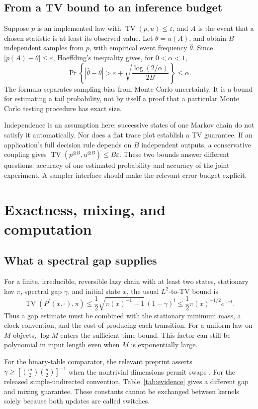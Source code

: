 \documentclass[11pt]{article}
\newcommand{\TV}{\operatorname{TV}}
\begin{document}
\subsection{From a TV bound to an inference budget}
Suppose \(p\) is an implemented law with \(\TV(p,u)\leq\varepsilon\), and \(A\) is the event that a chosen statistic is at least its observed value. Let \(\theta=u(A)\), and obtain \(B\) independent samples from \(p\), with empirical event frequency \(\widehat\theta\). Since \(|p(A)-\theta|\leq\varepsilon\), Hoeffding's inequality \cite{Hoeffding1963} gives, for \(0<\alpha<1\),
\[
 \Pr\!\left\{|\widehat\theta-\theta|
 >\varepsilon+\sqrt{\frac{\log(2/\alpha)}{2B}}\right\}
 \leq\alpha.
\]
The formula separates sampling bias from Monte Carlo uncertainty. It is a bound for estimating a tail probability, not by itself a proof that a particular Monte Carlo testing procedure has exact size.

Independence is an assumption here: successive states of one Markov chain do not satisfy it automatically. Nor does a flat trace plot establish a TV guarantee. If an application's full decision rule depends on \(B\) independent outputs, a conservative coupling gives \(\TV(p^{\otimes B},u^{\otimes B})\leq B\varepsilon\). These two bounds answer different questions: accuracy of one estimated probability and accuracy of the joint experiment. A sampler interface should make the relevant error budget explicit.

\section{Exactness, mixing, and computation}
\subsection{What a spectral gap supplies}
For a finite, irreducible, reversible lazy chain with at least two states, stationary law \(\pi\), spectral gap \(\gamma\), and initial state \(x\), the usual \(L^2\)-to-TV bound \cite[Chapter~12]{LP2017} is
\[
 \TV(P^t(x,\cdot),\pi)
 \leq\frac12\sqrt{\pi(x)^{-1}-1}\,(1-\gamma)^t
 \leq\frac12\pi(x)^{-1/2}e^{-\gamma t}.
\]
Thus a gap estimate must be combined with the stationary minimum mass, a clock convention, and the cost of producing each transition. For a uniform law on \(M\) objects, \(\log M\) enters the sufficient time bound. This factor can still be polynomial in input length even when \(M\) is exponentially large.

For the binary-table comparator, the relevant preprint asserts
\(\gamma\geq[\binom m2\binom n2]^{-1}\) when the nontrivial dimensions permit swaps \cite{FQW2026}. For the released simple-undirected convention, Table~\ref{tab:evidence} gives a different gap and mixing guarantee. These constants cannot be exchanged between kernels solely because both updates are called switches.
\end{document}
